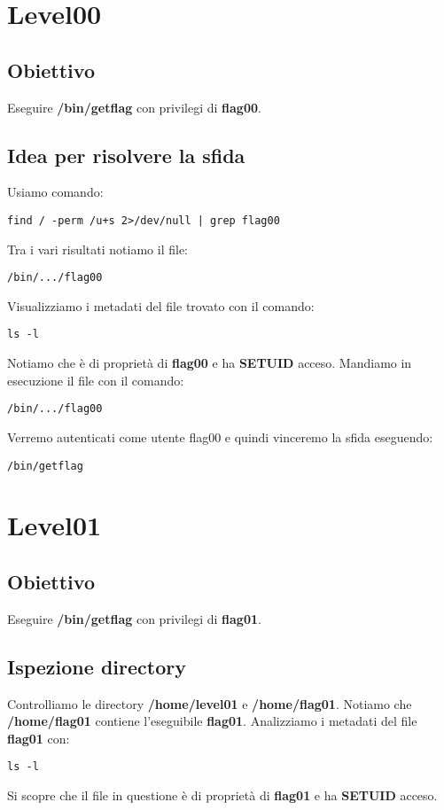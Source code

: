 \section{Level00}
\subsection{Obiettivo}
Eseguire \textbf{/bin/getflag} con privilegi di \textbf{flag00}.
\subsection{Idea per risolvere la sfida}
Usiamo comando: 
\begin{lstlisting}[style=bashstyle]
    find / -perm /u+s 2>/dev/null | grep flag00
\end{lstlisting}
Tra i vari risultati notiamo il file: 
\begin{lstlisting}[style=bashstyle]
    /bin/.../flag00
\end{lstlisting}
Visualizziamo i metadati del file trovato con il comando:
\begin{lstlisting}[style=bashstyle]
    ls -l
\end{lstlisting} 
Notiamo che è di proprietà di \textbf{flag00} e ha \textbf{SETUID} acceso.
Mandiamo in esecuzione il file con il comando: 
\begin{lstlisting}[style=bashstyle]
    /bin/.../flag00
\end{lstlisting} 
Verremo autenticati come utente flag00 e quindi vinceremo la sfida eseguendo:
\begin{lstlisting}[style=bashstyle]
    /bin/getflag
\end{lstlisting}


\section{Level01}
\subsection{Obiettivo}
Eseguire \textbf{/bin/getflag} con privilegi di \textbf{flag01}.
\subsection{Ispezione directory}
Controlliamo le directory \textbf{/home/level01} e \textbf{/home/flag01}. Notiamo che \textbf{/home/flag01} contiene l’eseguibile \textbf{flag01}.
Analizziamo i metadati del file \textbf{flag01} con: 
\begin{lstlisting}[style=bashstyle]
    ls -l
\end{lstlisting}
Si scopre che il file in questione è di proprietà di \textbf{flag01} e ha \textbf{SETUID} acceso.
